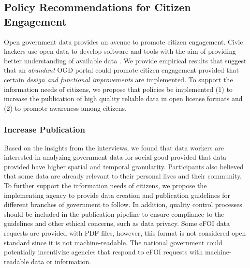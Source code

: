 \documentclass{sigchi}
\begin{document}

\subsection{Policy Recommendations for Citizen Engagement}
Open government data provides an avenue to promote citizen engagement. Civic hackers use open data to develop software and tools with the aim of providing better understanding of available data \cite{Choi2017, Puussaar2018, Robinson2016}. We provide empirical results that suggest that an \textit{abundant} OGD portal could promote citizen engagement provided that certain \textit{design and functional improvements} are implemented. To support the information needs of citizens, we propose that policies be implemented (1) to increase the publication of high quality reliable data in open license formats and (2) to promote awareness among citizens. 

\subsubsection{Increase Publication}
Based on the insights from the interviews, we found that data workers are interested in analyzing government data for social good provided that data provided have higher spatial and temporal granularity. Participants also believed that some data are already relevant to their personal lives and their community. To further support the information needs of citizens, we propose the implementing agency to provide data creation and publication guidelines for different branches of government to follow. In addition, quality control processes should be included in the publication pipeline to ensure compliance to the guidelines and other ethical concerns, such as data privacy. Some eFOI data requests are provided with PDF files, however, this format is not considered open standard since it is not machine-readable. The national government could potentially incentivize agencies that respond to eFOI requests with machine-readable data or information. 
\end{document}
